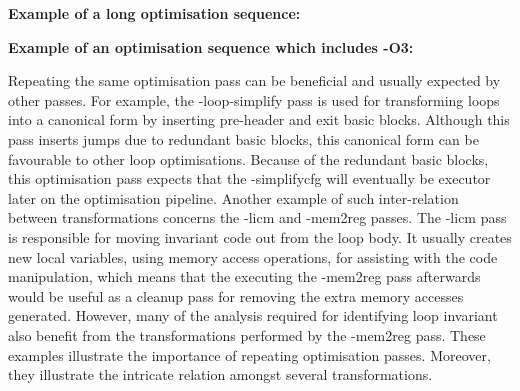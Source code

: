   \begin{minipage}{0.9\textwidth}
     \vspace{1em}
     \singlespace
     \noindent\textbf{Example of a long optimisation sequence:}\vspace{-1ex}
  \end{minipage}

  \begin{minipage}{0.9\textwidth}
     \vspace{1em}
     \singlespace
     \noindent\textbf{Example of an optimisation sequence which includes {-O3}:}\vspace{-1ex}
     \vspace{2em}
  \end{minipage}

Repeating the same optimisation pass can be beneficial and usually expected by other passes.
For example, the {\flagstype -loop-simplify} pass is used for transforming loops into a canonical form by inserting pre-header and exit basic blocks.
Although this pass inserts jumps due to redundant basic blocks, this canonical form can be favourable to other loop optimisations.
Because of the redundant basic blocks, this optimisation pass expects that the {\flagstype -simplifycfg} will eventually be executor later on the optimisation pipeline.
Another example of such inter-relation between transformations concerns the {\flagstype -licm} and {\flagstype -mem2reg} passes.
The {\flagstype -licm} pass is responsible for moving invariant code out from the loop body.
It usually creates new local variables, using memory access operations, for assisting with the code manipulation, which means that the executing the {\flagstype -mem2reg} pass afterwards would be useful as a cleanup pass for removing the extra memory accesses generated.
However, many of the analysis required for identifying loop invariant also benefit from the transformations performed by the {\flagstype -mem2reg} pass.
These examples illustrate the importance of repeating optimisation passes.
Moreover, they illustrate the intricate relation amongst several transformations.

